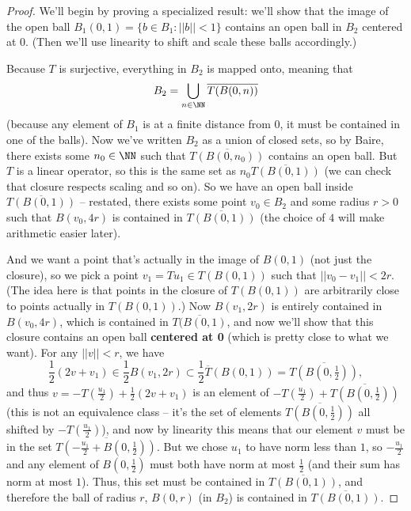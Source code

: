 \begin{proof}
We'll begin by proving a specialized result: we'll show that the image of the open ball $B_1(0, 1) = \{b \in B_1: ||b|| < 1\}$ contains an open ball in $B_2$ centered at $0$. (Then we'll use linearity to shift and scale these balls accordingly.)

Because $T$ is surjective, everything in $B_2$ is mapped onto, meaning that 
\[
    B_2 = \bigcup_{n \in \NN} \overline{T(B(0, n))}
\]  
(because any element of $B_1$ is at a finite distance from $0$, it must be contained in one of the balls). Now we've written $B_2$ as a union of closed sets, so by Baire, there exists some $n_0 \in \NN$ such that $\overline{T(B(0, n_0))}$ contains an open ball. But $T$ is a linear operator, so this is the same set as $n_0 \overline{T(B(0, 1))}$ (we can check that closure respects scaling and so on). So we have an open ball inside $\overline{T(B(0, 1))}$ -- restated, there exists some point $v_0 \in B_2$ and some radius $r > 0$ such that $B(v_0, 4r)$ is contained in $\overline{T(B(0, 1))}$ (the choice of $4$ will make arithmetic easier later). 

And we want a point that's actually in the image of $B(0, 1)$ (not just the closure), so we pick a point $v_1 = Tu_1 \in T(B(0, 1))$ such that $||v_0 - v_1|| < 2r$. (The idea here is that points in the closure of $T(B(0, 1))$ are arbitrarily close to points actually in $T(B(0, 1))$.) Now $B(v_1, 2r)$ is entirely contained in $B(v_0, 4r)$, which is contained in $\overline{T(B(0, 1)}$, and now we'll show that this closure contains an open ball \textbf{centered at 0} (which is pretty close to what we want). For any $||v|| < r$, we have
\[
    \frac{1}{2}(2v + v_1) \in \frac{1}{2}B(v_1, 2r) \subset \frac{1}{2}\overline{T}(B(0, 1)) = \overline{T(B(0, \tfrac{1}{2}))},
\]
and thus $v = -T\left(\frac{u_1}{2}\right) + \frac{1}{2}(2v + v_1)$ is an element of $-T\left(\frac{u_1}{2}\right) + \overline{T(B(0, \frac{1}{2}))}$ (this is not an equivalence class -- it's the set of elements $\overline{T(B(0, \frac{1}{2}))}$ all shifted by $-T\left(\frac{u_1}{2}\right)$), and now by linearity this means that our element $v$ must be in the set $\overline{T\left(-\frac{u_1}{2} + B\left(0, \tfrac{1}{2}\right)\right)}$. But we chose $u_1$ to have norm less than $1$, so $-\frac{u_1}{2}$ and any element of $B(0, \frac{1}{2})$ must both have norm at most $\frac{1}{2}$ (and their sum has norm at most $1$). Thus, this set must be contained in $\overline{T(B(0, 1))}$, and therefore the ball of radius $r$, $B(0, r)$ (in $B_2$) is contained in $\overline{T(B(0, 1))}$. 


\end{proof}
